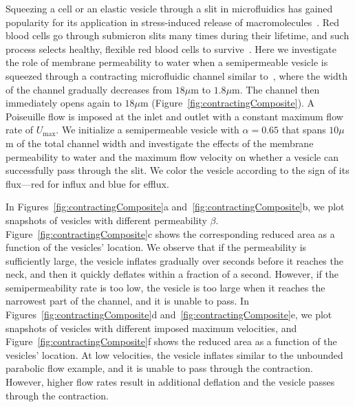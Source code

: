 \documentclass[9pt,twocolumn,twoside,lineno]{pnas-new}
\begin{document}
Squeezing a cell or an elastic vesicle through a slit in microfluidics
has gained popularity for its application in stress-induced release of
macromolecules~\cite{ShareiEtAl2013_PNAS, Pak2015_PNAS,
ZhangShenHoganBarakatMisbah2018_BJ, LuoBai2019_PoF}. Red blood cells go
through submicron slits many times during their lifetime, and such
process selects healthy, flexible red blood cells to
survive~\cite{wu2015critical,LuPeng2019_PoF}. Here we investigate the
role of membrane permeability to water when a semipermeable vesicle is
squeezed through a contracting microfluidic channel similar
to~\cite{wu2015critical}, where the width of the channel gradually
decreases from $18 \mu$m to $1.8 \mu$m. The channel then immediately
opens again to $18 \mu$m (Figure~\ref{fig:contractingComposite}). A
Poiseuille flow is imposed at the inlet and outlet with a constant
maximum flow rate of $U_{\max}$. We initialize a semipermeable vesicle
with $\alpha = 0.65$ that spans $10 \mu$m of the total channel width and
investigate the effects of the membrane permeability to water and the
maximum flow velocity on whether a vesicle can successfully pass through
the slit. We color the vesicle according to the sign of its flux---red
for influx and blue for efflux.

In Figures~\ref{fig:contractingComposite}a
and~\ref{fig:contractingComposite}b, we plot snapshots of vesicles with
different permeability $\beta$. Figure~\ref{fig:contractingComposite}c
shows the corresponding reduced area as a function of the vesicles'
location. We observe that if the permeability is sufficiently large, the
vesicle inflates gradually over seconds before it reaches the neck, and
then it quickly deflates within a fraction of a second. However, if the
semipermeability rate is too low, the vesicle is too large when it
reaches the narrowest part of the channel, and it is unable to pass. In
Figures~\ref{fig:contractingComposite}d
and~\ref{fig:contractingComposite}e, we plot snapshots of vesicles with
different imposed maximum velocities, and
Figure~\ref{fig:contractingComposite}f shows the reduced area as a
function of the vesicles' location. At low velocities, the vesicle
inflates similar to the unbounded parabolic flow example, and it is
unable to pass through the contraction. However, higher flow rates
result in additional deflation and the vesicle passes through the
contraction.
\end{document}
